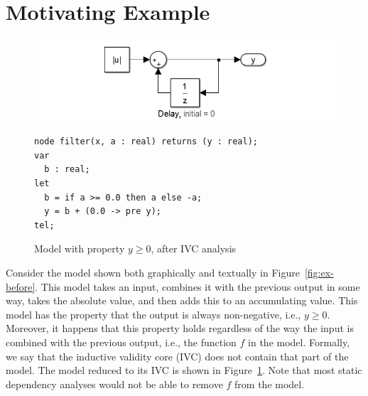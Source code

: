 \section{Motivating Example}
\label{sec:exmpl}

\begin{figure}[t]
\includegraphics[width=\columnwidth]{figs/simulink-ivc.png}
{\smaller
\begin{verbatim}
node filter(x, a : real) returns (y : real);
var
  b : real;
let
  b = if a >= 0.0 then a else -a;
  y = b + (0.0 -> pre y);
tel;
\end{verbatim}
}
\caption{Model with property $y \geq 0$, after IVC analysis}
\label{fig:ex-after}
\end{figure}

Consider the model shown both graphically and textually in
Figure~\ref{fig:ex-before}. This model takes an input, combines it
with the previous output in some way, takes the absolute value, and
then adds this to an accumulating value. This model has the property
that the output is always non-negative, i.e., $y \geq 0$. Moreover, it
happens that this property holds regardless of the way the input is
combined with the previous output, i.e., the function $f$ in the
model. Formally, we say that the inductive validity core (IVC) does
not contain that part of the model. The model reduced to its IVC is
shown in Figure~\ref{fig:ex-after}. Note that most static dependency
analyses would not be able to remove $f$ from the model.

